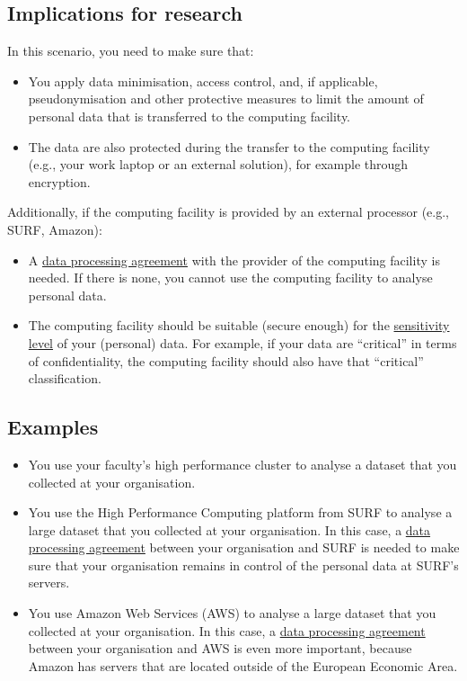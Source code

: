 \documentclass[
]{book}
\providecommand{\tightlist}{%
  \setlength{\itemsep}{0pt}\setlength{\parskip}{0pt}}
\begin{document}
\hypertarget{implications-for-research}{%
\subsection{Implications for research}\label{implications-for-research}}

In this scenario, you need to make sure that:

\begin{itemize}
\tightlist
\item
  You apply data minimisation, access control, and, if applicable,
  pseudonymisation and other protective measures to limit the amount of personal
  data that is transferred to the computing facility.
\item
  The data are also protected during the transfer to the computing facility
  (e.g., your work laptop or an external solution), for example through encryption.
\end{itemize}

Additionally, if the computing facility is provided by an external processor
(e.g., SURF, Amazon):

\begin{itemize}
\tightlist
\item
  A \protect\hyperlink{data-processing-agreement}{data processing agreement} with the provider of
  the computing facility is needed. If there is none, you cannot use the computing
  facility to analyse personal data.
\item
  The computing facility should be suitable (secure enough) for the
  \protect\hyperlink{data-classification}{sensitivity level} of your (personal) data. For example,
  if your data are ``critical'' in terms of confidentiality, the computing facility
  should also have that ``critical'' classification.
\end{itemize}

\hypertarget{examples}{%
\subsection{Examples}\label{examples}}

\begin{itemize}
\tightlist
\item
  You use your faculty's high performance cluster to analyse a dataset that you
  collected at your organisation.
\item
  You use the High Performance Computing platform from SURF to analyse a large
  dataset that you collected at your organisation. In this case, a
  \protect\hyperlink{data-processing-agreement}{data processing agreement} between your organisation
  and SURF is needed to make sure that your organisation remains in control of the
  personal data at SURF's servers.
\item
  You use Amazon Web Services (AWS) to analyse a large dataset that you
  collected at your organisation. In this case, a
  \protect\hyperlink{data-processing-agreement}{data processing agreement} between your organisation
  and AWS is even more important, because Amazon has servers that are located
  outside of the European Economic Area.
\end{itemize}
\end{document}
